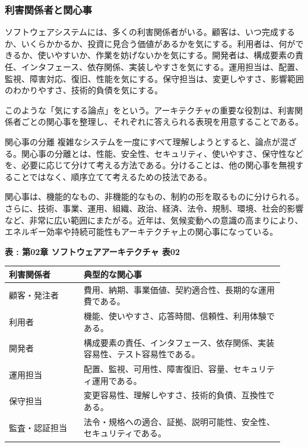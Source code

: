 \subsubsection{利害関係者と関心事}
ソフトウェアシステムには、多くの利害関係者がいる。顧客は、いつ完成するか、いくらかかるか、投資に見合う価値があるかを気にする。利用者は、何ができるか、使いやすいか、作業を妨げないかを気にする。開発者は、構成要素の責任、インタフェース、依存関係、実装しやすさを気にする。運用担当は、配置、監視、障害対応、復旧、性能を気にする。保守担当は、変更しやすさ、影響範囲のわかりやすさ、技術的負債を気にする。

このような「気にする論点」をという。アーキテクチャの重要な役割は、利害関係者ごとの関心事を整理し、それぞれに答えられる表現を用意することである。

\begin{statementbox}{関心事の分離}
複雑なシステムを一度にすべて理解しようとすると、論点が混ざる。関心事の分離とは、性能、安全性、セキュリティ、使いやすさ、保守性などを、必要に応じて分けて考える方法である。分けることは、他の関心事を無視することではなく、順序立てて考えるための技法である。
\end{statementbox}

関心事は、機能的なもの、非機能的なもの、制約の形を取るものに分けられる。さらに、技術、事業、運用、組織、政治、経済、法令、規制、環境、社会的影響など、非常に広い範囲にまたがる。近年は、気候変動への意識の高まりにより、エネルギー効率や持続可能性もアーキテクチャ上の関心事になっている。

\par\smallskip\noindent{}\label{tab:ch02-02}\textbf{表 \thetable: 第02章 ソフトウェアアーキテクチャ 表02}\par\smallskip
\begin{longtable}{P{0.25\linewidth}P{0.67\linewidth}}
\toprule
利害関係者 & 典型的な関心事 \\
\midrule
顧客・発注者 & 費用、納期、事業価値、契約適合性、長期的な運用費である。 \\
利用者 & 機能、使いやすさ、応答時間、信頼性、利用体験である。 \\
開発者 & 構成要素の責任、インタフェース、依存関係、実装容易性、テスト容易性である。 \\
運用担当 & 配置、監視、可用性、障害復旧、容量、セキュリティ運用である。 \\
保守担当 & 変更容易性、理解しやすさ、技術的負債、互換性である。 \\
監査・認証担当 & 法令・規格への適合、証拠、説明可能性、安全性、セキュリティである。 \\
\bottomrule
\end{longtable}

